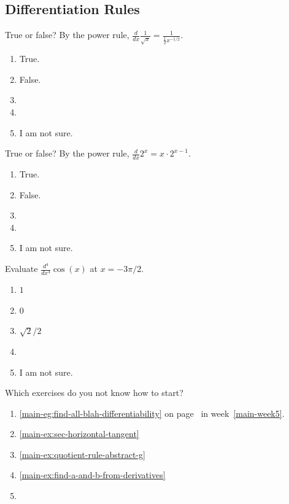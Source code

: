 \documentclass[aspectratio=169, 14pt, t]{beamer}  %
\begin{document}
\subsection{Differentiation Rules}

\begin{poll}
  True or false? By the power rule, \(\frac{d}{dx} \frac{1}{\sqrt{x}} = \frac{1}{\frac{1}{2}x^{-1/2}}\).

  \begin{enumerate}
    \item True.
    \item False.
    \item
    \item
    \item I am not sure.
  \end{enumerate}
\end{poll}

\begin{poll}
  True or false? By the power rule, \(\frac{d}{dx} 2^{x} = x \cdot 2^{x-1}\).

  \begin{enumerate}
    \item True.
    \item False.
    \item
    \item
    \item I am not sure.
  \end{enumerate}
\end{poll}

\begin{poll}
  Evaluate \(\frac{d^{4}}{dx^{4}} \cos(x)\) at \(x = -3\pi/2\).

  \begin{enumerate}
    \item \(1\)
    \item \(0\)
    \item \(\sqrt{2}/2\)
    \item
    \item I am not sure.
  \end{enumerate}
\end{poll}

\begin{poll}
  Which exercises do you not know how to start?

  \begin{enumerate}
    \item \ref{main-eg:find-all-blah-differentiability} on page~\pageref{main-eg:find-all-blah-differentiability} in week~\ref{main-week5}.
    \item \ref{main-ex:sec-horizontal-tangent}
    \item \ref{main-ex:quotient-rule-abstract-g}
    \item \ref{main-ex:find-a-and-b-from-derivatives}
    \item
  \end{enumerate}
\end{poll}
\end{document}
